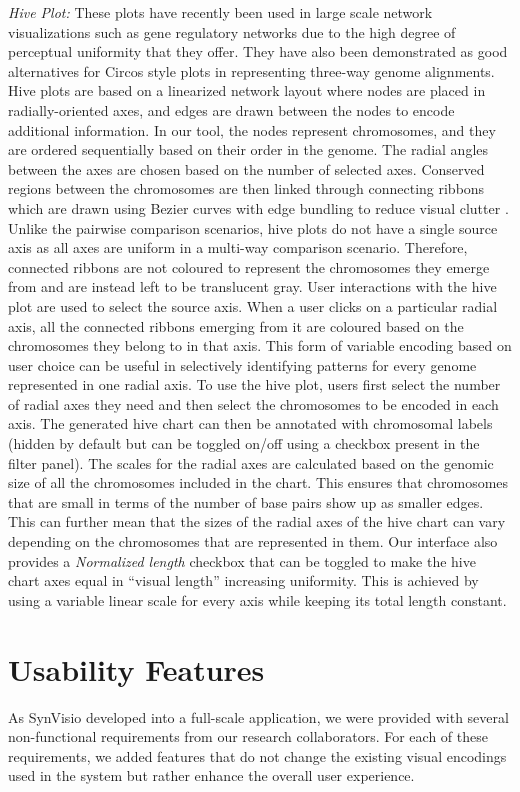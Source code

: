 \textit{Hive Plot:} These plots have recently been used in large scale network visualizations such as gene regulatory networks due to the high degree of perceptual uniformity that they offer\cite{krzywinski2011hive}. They have also been demonstrated as good alternatives for Circos \cite{krzywinski2009circos} style plots in representing three-way genome alignments. Hive plots are based on a linearized network layout where nodes are placed in radially-oriented axes, and edges are drawn between the nodes to encode additional information. In our tool, the nodes represent chromosomes, and they are ordered sequentially based on their order in the genome. The radial angles between the axes are chosen based on the number of selected axes. Conserved regions between the chromosomes are then linked through connecting ribbons which are drawn using Bezier curves with edge bundling to reduce visual clutter \cite{zhou2013edge}. Unlike the pairwise comparison scenarios, hive plots do not have a single source axis as all axes are uniform in a multi-way comparison scenario. Therefore, connected ribbons are not coloured to represent the chromosomes they emerge from and are instead left to be translucent gray. User interactions with the hive plot are used to select the source axis. When a user clicks on a particular radial axis, all the connected ribbons emerging from it are coloured based on the chromosomes they belong to in that axis. This form of variable encoding based on user choice can be useful in selectively identifying patterns for every genome represented in one radial axis. To use the hive plot, users first select the number of radial axes they need and then select the chromosomes to be encoded in each axis. The generated hive chart can then be annotated with chromosomal labels (hidden by default but can be toggled on/off using a checkbox present in the filter panel). The scales for the radial axes are calculated based on the genomic size of all the chromosomes included in the chart. This ensures that chromosomes that are small in terms of the number of base pairs show up as smaller edges. This can further mean that the sizes of the radial axes of the hive chart can vary depending on the chromosomes that are represented in them. Our interface also provides a \textit{Normalized length} checkbox that can be toggled to make the hive chart axes equal in ``visual length'' increasing uniformity. This is achieved by using a variable linear scale for every axis while keeping its total length constant.

\section{Usability Features}
As SynVisio developed into a full-scale application, we were provided with several non-functional requirements from our research collaborators. For each of these requirements, we added features that do not change the existing visual encodings used in the system but rather enhance the overall user experience. 

